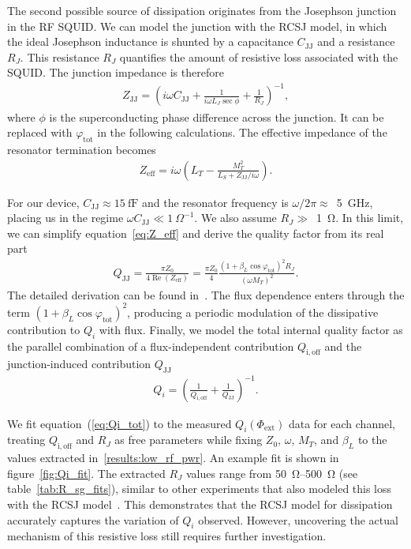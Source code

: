 \documentclass[
 prd,
 reprint,
 superscriptaddress,
 amsmath,amssymb,
 aps,
 floatfix,
]{revtex4-2}
\begin{document}
The second possible source of dissipation originates from the Josephson junction in the RF SQUID. We can model the junction with the RCSJ model, in which the ideal Josephson inductance is shunted by a capacitance $C_{\mathrm{JJ}}$ and a resistance $R_J$. This resistance $R_J$ quantifies the amount of resistive loss associated with the SQUID. The junction impedance is therefore
\begin{gather}
Z_{\mathrm{JJ}} =
\left(
i \omega C_{\mathrm{JJ}}
+ \frac{1}{i \omega L_J \sec \phi}
+ \frac{1}{R_J}
\right)^{-1},
\label{eq:ZJJ}
\end{gather}
where $\phi$ is the superconducting phase difference across the junction. It can be replaced with $\varphi_{\mathrm{tot}}$ in the following calculations. The effective impedance of the resonator termination becomes
\begin{gather}
Z_{\mathrm{eff}} = i \omega
\left(
L_T - \frac{M_T^2}{L_S + Z_{\mathrm{JJ}}/i\omega}
\right).
\label{eq:Z_eff}
\end{gather}

For our device, $C_{\mathrm{JJ}} \approx 15~\mathrm{fF}$ and the resonator frequency is $\omega/2\pi \approx$~\qty{5}{\GHz}, placing us in the regime $\omega C_{\mathrm{JJ}} \ll 1~\Omega^{-1}$. We also assume $R_J \gg$~\qty{1}{\ohm}. In this limit, we can simplify equation~\eqref{eq:Z_eff} and derive the quality factor from its real part
\begin{gather}
Q_{\mathrm{JJ}} =
\frac{\pi Z_0}{4 \operatorname{Re}(Z_{\mathrm{eff}})}
=
\frac{\pi Z_0}{4}
\frac{(1 + \beta_L \cos \varphi_{\mathrm{tot}})^2 R_J}
{(\omega M_T)^2}.
\label{eq:QJJ}
\end{gather}
The detailed derivation can be found in~\cite{mates_microwave_2011}. The flux dependence enters through the term $(1 + \beta_L \cos \varphi_{\mathrm{tot}})^2$, producing a periodic modulation of the dissipative contribution to $Q_i$ with flux. Finally, we model the total internal quality factor as the parallel combination of a flux-independent contribution $Q_{\mathrm{i,off}}$ and the junction-induced contribution $Q_{\mathrm{JJ}}$ ~\cite{kempf_design_2017}
\begin{gather}
Q_i =
\left(
\frac{1}{Q_{\mathrm{i,off}}}
+
\frac{1}{Q_{\mathrm{JJ}}}
\right)^{-1}.
\label{eq:Qi_tot}
\end{gather}

We fit equation~(\ref{eq:Qi_tot}) to the measured $Q_i(\Phi_{\mathrm{ext}})$ data for each channel, treating $Q_{\mathrm{i,off}}$ and $R_J$ as free parameters while fixing $Z_0$, $\omega$, $M_T$, and $\beta_L$ to the values extracted in~\cref{results:low_rf_pwr}. An example fit is shown in figure~\ref{fig:Qi_fit}. The extracted $R_J$ values range from \qty{50}{\ohm}--\qty{500}{\ohm} (see table~\ref{tab:R_sg_fits}), similar to other experiments that also modeled this loss with the RCSJ model~\cite{kempf_design_2017}. This demonstrates that the RCSJ model for dissipation accurately captures the variation of $Q_i$ observed. However, uncovering the actual mechanism of this resistive loss still requires further investigation.
\end{document}
